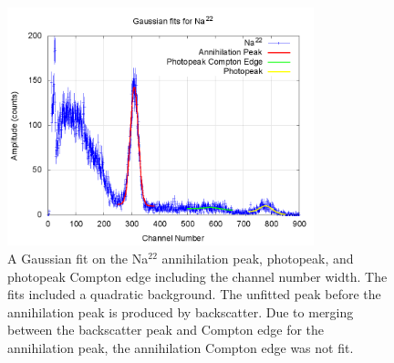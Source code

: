 \documentclass[aps,prl,twocolumn,superscriptaddress,nofootinbib]{revtex4-1}
\begin{document}
\begin{figure}[h!]
  \begin{center}
\centerline{\includegraphics[width=3.5in]{nacomp.png}}
\caption{\small{A Gaussian fit on the Na$^{22}$ annihilation peak, photopeak, and photopeak Compton edge including the channel number width. The fits included a quadratic background. The unfitted peak before the annihilation peak is produced by backscatter. Due to merging between the backscatter peak and Compton edge for the annihilation peak, the annihilation Compton edge was not fit. \label{fig4}}}
  \end{center}
\end{figure}
\end{document}
